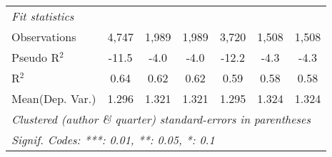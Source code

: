 \begin{tabular}{lcccccc}
   \midrule
   \emph{Fit statistics}\\
   Observations            & 4,747   & 1,989   & 1,989   & 3,720       & 1,508   & 1,508\\  
   Pseudo R$^2$            & -11.5   & -4.0    & -4.0    & -12.2       & -4.3    & -4.3\\  
   R$^2$                   & 0.64    & 0.62    & 0.62    & 0.59        & 0.58    & 0.58\\  
Mean(Dep. Var.) & 1.296 & 1.321 & 1.321 & 1.295 & 1.324 & 1.324 \\
   \midrule \midrule
   \multicolumn{7}{l}{\emph{Clustered (author \& quarter) standard-errors in parentheses}}\\
   \multicolumn{7}{l}{\emph{Signif. Codes: ***: 0.01, **: 0.05, *: 0.1}}\\
\end{tabular}
\par\endgroup
